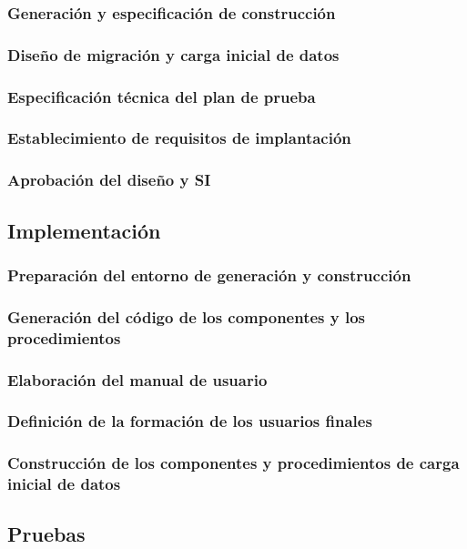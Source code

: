 \documentclass[11pt,a4paper,spanish,twoside]{book}
\begin{document}
\subsubsection{Generación y especificación de construcción}
\subsubsection{Diseño de migración y carga inicial de datos}
\subsubsection{Especificación técnica del plan de prueba}
\subsubsection{Establecimiento de requisitos de implantación}
\subsubsection{Aprobación del diseño y SI}

\subsection{Implementación}
\subsubsection{Preparación del entorno de generación y construcción}
\subsubsection{Generación del código de los componentes y los 
procedimientos}
\subsubsection{Elaboración del manual de usuario}
\subsubsection{Definición de la formación de los usuarios finales}
\subsubsection{Construcción de los componentes y procedimientos de carga
  inicial de datos} 

\subsection{Pruebas}
\end{document}

